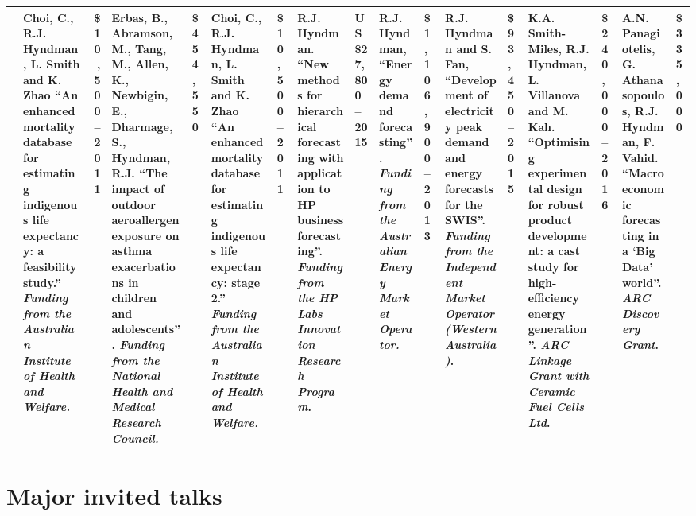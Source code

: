 \documentclass[a4paper,10pt]{article}
\begin{document}
{\begin{tabular}{@{}lP{13.3cm}r@{}}
 & Choi, C., R.J. Hyndman, L. Smith and K. Zhao ``An enhanced mortality database for estimating indigenous life expectancy: a feasibility study.'' \emph{Funding from the Australian Institute of Health and Welfare.} &\$10,500
--2011 & Erbas, B., Abramson, M., Tang, M., Allen, K., Newbigin, E., Dharmage, S., Hyndman, R.J. ``The impact of outdoor aeroallergen exposure on asthma exacerbations in children and adolescents''. \emph{Funding from the National Health and Medical Research Council.} &\$454,550
 & Choi, C., R.J. Hyndman, L. Smith and K. Zhao ``An enhanced mortality database for estimating indigenous life expectancy: stage 2.'' \emph{Funding from the Australian Institute of Health and Welfare.} &\$10,500
--2011 & R.J. Hyndman. ``New methods for hierarchical forecasting with application to HP business forecasting''. \emph{Funding from the HP Labs Innovation Research Program}. &US\$27,800
--2015 & R.J. Hyndman, ``Energy demand forecasting''. \emph{Funding from the Australian Energy Market Operator.} &\$1,106,900
--2013 & R.J. Hyndman and S. Fan, ``Development of electricity peak demand and energy forecasts for the SWIS''. \emph{Funding from the Independent Market Operator (Western Australia)}. &\$93,450
--2015 & K.A. Smith-Miles, R.J. Hyndman, L. Villanova and M. Kah. ``Optimising experimental design for robust product development: a cast study for high-efficiency energy generation''. \emph{ARC Linkage Grant with Ceramic Fuel Cells Ltd}. & \$240,000--2016 & A.N. Panagiotelis, G. Athanasopoulos, R.J. Hyndman, F. Vahid. ``Macroeconomic forecasting in a `Big Data' world''. \emph{ARC Discovery Grant}.& \$335,000\\
\bottomrule
\end{tabular}}

\clearpage

\section{Major invited talks}
\end{document}
